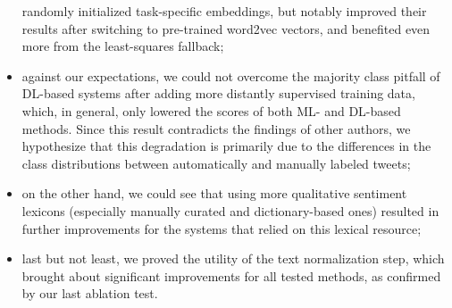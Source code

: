 \begin{itemize}
    randomly initialized task-specific embeddings, but notably
    improved their results after switching to pre-trained word2vec
    vectors, and benefited even more from the least-squares fallback;
  \item against our expectations, we could not overcome the majority
    class pitfall of DL-based systems after adding more distantly
    supervised training data, which, in general, only lowered the
    scores of both ML- and DL-based methods.  Since this result
    contradicts the findings of other authors, we hypothesize that
    this degradation is primarily due to the differences in the class
    distributions between automatically and manually labeled tweets;
  \item on the other hand, we could see that using more qualitative
    sentiment lexicons (especially manually curated and
    dictionary-based ones) resulted in further improvements for the
    systems that relied on this lexical resource;
  \item last but not least, we proved the utility of the text
    normalization step, which brought about significant improvements
    for all tested methods, as confirmed by our last ablation test.
\end{itemize}
